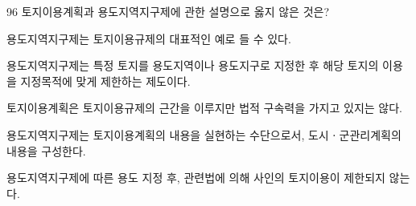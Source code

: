 \begin{question}{96}
토지이용계획과 용도지역지구제에 관한 설명으로 옳지 않은 것은?
\begin{choices}
  \item 용도지역지구제는 토지이용규제의 대표적인 예로 들 수 있다.
  \item 용도지역지구제는 특정 토지를 용도지역이나 용도지구로 지정한 후 해당 토지의 이용을 지정목적에 맞게 제한하는 제도이다.
  \item 토지이용계획은 토지이용규제의 근간을 이루지만 법적 구속력을 가지고 있지는 않다.
  \item 용도지역지구제는 토지이용계획의 내용을 실현하는 수단으로서, 도시ㆍ군관리계획의 내용을 구성한다.
  \item 용도지역지구제에 따른 용도 지정 후, 관련법에 의해 사인의 토지이용이 제한되지 않는다.
\end{choices}
\end{question}
